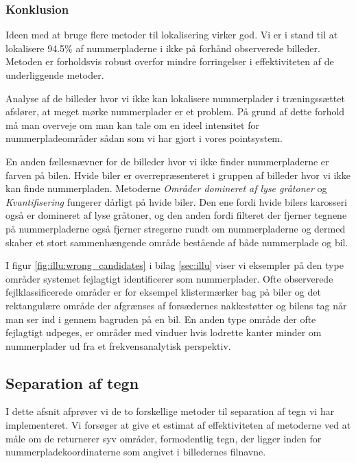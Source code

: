 \subsubsection{Konklusion}
Ideen med at bruge flere metoder til lokalisering virker god. Vi er i stand til at lokalisere 94.5\% af nummerpladerne i ikke på forhånd observerede billeder. Metoden er forholdsvis robust overfor mindre forringelser i effektiviteten af de underliggende metoder.

Analyse af de billeder hvor vi ikke kan lokalisere nummerplader i træningssættet afslører, at meget mørke nummerplader er et problem. På grund af dette forhold må man overveje om man kan tale om en ideel intensitet for nummerpladeområder sådan som vi har gjort i vores pointsystem.

En anden fællesnævner for de billeder hvor vi ikke finder nummerpladerne er farven på bilen. Hvide biler er overrepræsenteret i gruppen af billeder hvor vi ikke kan finde nummerpladen. Metoderne \textit{Områder domineret af lyse gråtoner} og \textit{Kvantifisering} fungerer dårligt på hvide biler. Den ene fordi hvide bilers karosseri også er domineret af lyse gråtoner, og den anden fordi filteret der fjerner tegnene på nummerpladerne også fjerner stregerne rundt om nummerpladerne og dermed skaber et stort sammenhængende område bestående af både nummerplade og bil. 

I figur \vref{fig:illu:wrong_candidates} i bilag \ref{sec:illu} viser vi eksempler på den type områder systemet fejlagtigt identificerer som nummerplader. Ofte observerede fejlklassificerede områder er for eksempel  klistermærker bag på biler og det rektangulære område der afgrænses af forsædernes nakkestøtter og bilens tag når man ser ind i gennem bagruden på en bil. En anden type område der ofte fejlagtigt udpeges, er områder med vinduer hvis lodrette kanter minder om nummerplader ud fra et frekvensanalytisk perspektiv.  



\subsection{Separation af tegn}
I dette afsnit afprøver vi de to forskellige metoder til separation af tegn vi har implementeret. Vi forsøger at give et estimat af effektiviteten af metoderne ved at måle om de returnerer syv områder, formodentlig tegn, der ligger inden for nummerpladekoordinaterne som angivet i billedernes filnavne. 

